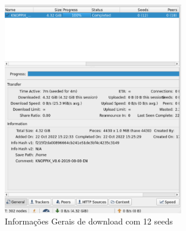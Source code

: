 \begin{figure}[!htb]
\centering
\includegraphics[width=0.7\textwidth]{./images/geral 12 seeds.png}
\caption{Informações Gerais de download com 12 seeds}
\label{fig:geral_12_seeds}
\end{figure}